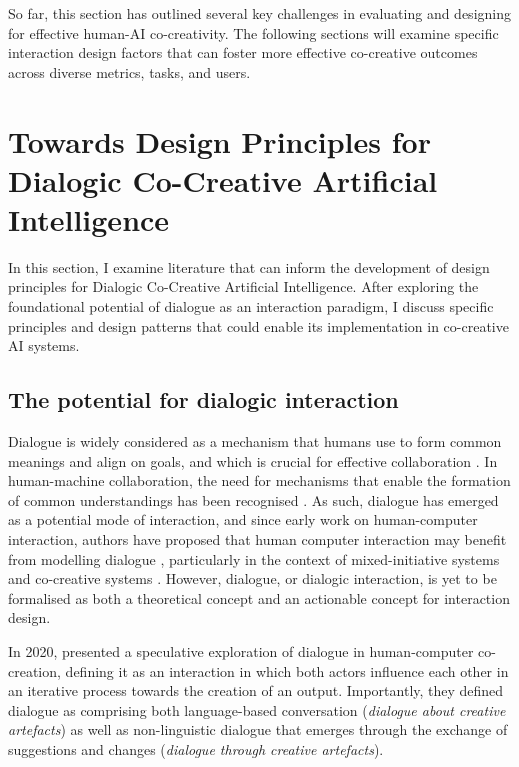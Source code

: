 So far, this section has outlined several key challenges in evaluating and designing for effective human-AI co-creativity. The following sections will examine specific interaction design factors that can foster more effective co-creative outcomes across diverse metrics, tasks, and users. 

\section{Towards Design Principles for Dialogic Co-Creative Artificial Intelligence}

In this section, I examine literature that can inform the development of design principles for Dialogic Co-Creative Artificial Intelligence. After exploring the foundational potential of dialogue as an interaction paradigm, I discuss specific principles and design patterns that could enable its implementation in co-creative AI systems.

\subsection{The potential for dialogic interaction}

Dialogue is widely considered as a mechanism that humans use to form common meanings and align on goals, and which is crucial for effective collaboration \citep{Bohm1996-fo}. In human-machine collaboration, the need for mechanisms that enable the formation of common understandings has been recognised \citep{Dafoe2021-in}. As such, dialogue has emerged as a potential mode of interaction, and since early work on human-computer interaction, authors have proposed that human computer interaction may benefit from modelling dialogue \citep{Hayes1983-ca}, particularly in the context of mixed-initiative systems and co-creative systems \citep{Allen1999-sr, Yannakakis2014-zs, Deterding2017-wh}. However, dialogue, or dialogic interaction, is yet to be formalised as both a theoretical concept and an actionable concept for interaction design. 

In 2020, \citet{Bown2020-oc} presented a speculative exploration of dialogue in human-computer co-creation, defining it as an interaction in which both actors influence each other in an iterative process towards the creation of an output. Importantly, they defined dialogue as comprising both language-based conversation (\textit{dialogue about creative artefacts}) as well as non-linguistic dialogue that emerges through the exchange of suggestions and changes (\textit{dialogue through creative artefacts}).

